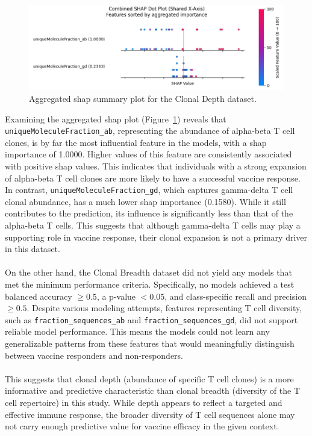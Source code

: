 \documentclass[12pt,a4paper]{report}
\begin{document}
\begin{figure}[h!]
    \centering
    \includegraphics[width=0.85\linewidth]{images/Aggregated_SHAP_Clonal_Depth_selected.png}
    \caption[Aggregated SHAP plot for Clonal Depth]{Aggregated \gls{shap} summary plot for the Clonal Depth dataset.}
    \label{fig:clonal_depth_shap_plot}
\end{figure}
\noindent
Examining the aggregated \gls{shap} plot (Figure~\ref{fig:clonal_depth_shap_plot}) reveals that \texttt{uniqueMoleculeFraction\_ab}, representing the abundance of alpha-beta T cell clones, is by far the most influential feature in the models, with a \gls{shap} importance of 1.0000. Higher values of this feature are consistently associated with positive \gls{shap} values. This indicates that individuals with a strong expansion of alpha-beta T cell clones are more likely to have a successful vaccine response. In contrast, \texttt{uniqueMoleculeFraction\_gd}, which captures gamma-delta T cell clonal abundance, has a much lower \gls{shap} importance (0.1580). While it still contributes to the prediction, its influence is significantly less than that of the alpha-beta T cells. This suggests that although gamma-delta T cells may play a supporting role in vaccine response, their clonal expansion is not a primary driver in this dataset.\\
\\
On the other hand, the Clonal Breadth dataset did not yield any models that met the minimum performance criteria. Specifically, no models achieved a test balanced accuracy $\geq 0.5$, a p-value $< 0.05$, and class-specific recall and precision $\geq 0.5$. Despite various modeling attempts, features representing T cell diversity, such as \texttt{fraction\_sequences\_ab} and \texttt{fraction\_sequences\_gd}, did not support reliable model performance. This means the models could not learn any generalizable patterns from these features that would meaningfully distinguish between vaccine responders and non-responders.\\
\\
This suggests that clonal depth (abundance of specific T cell clones) is a more informative and predictive characteristic than clonal breadth (diversity of the T cell repertoire) in this study. While depth appears to reflect a targeted and effective immune response, the broader diversity of T cell sequences alone may not carry enough predictive value for vaccine efficacy in the given context.
\end{document}
